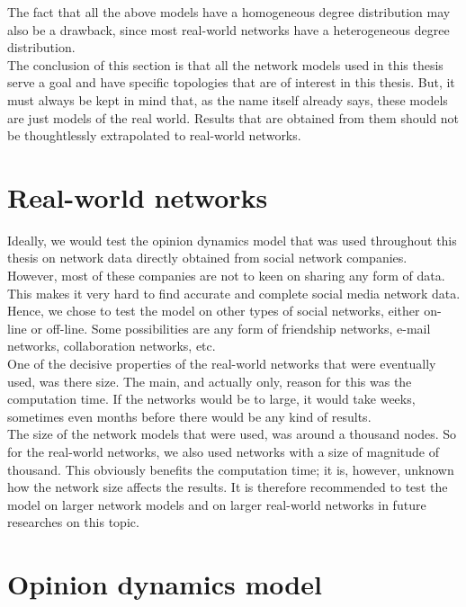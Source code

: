 \documentclass[11 pt , letterpaper , twoside , openright]{book}
\begin{document}
The fact that all the above models have a homogeneous degree distribution may also be a drawback, since most real-world networks have a heterogeneous degree distribution.\\
\newline
The conclusion of this section is that all the network models used in this thesis serve a goal and have specific topologies that are of interest in this thesis. But, it must always be kept in mind that, as the name itself already says, these models are just models of the real world. Results that are obtained from them should not be thoughtlessly extrapolated to real-world networks.


\section{Real-world networks}\label{realnetwork}

Ideally, we would test the opinion dynamics model that was used throughout this thesis on network data directly obtained from social network companies. However, most of these companies are not to keen on sharing any form of data. This makes it very hard to find accurate and complete social media network data. Hence, we chose to test the model on other types of social networks, either on-line or off-line. Some possibilities are any form of friendship networks, e-mail networks, collaboration networks, etc. \\
\newline
One of the decisive properties of the real-world networks that were eventually used, was there size. The main, and actually only, reason for this was the computation time. If the networks would be to large, it would take weeks, sometimes even months before there would be any kind of results.\\
The size of the network models that were used, was around a thousand nodes. So for the real-world networks, we also used networks with a size of magnitude of thousand. This obviously benefits the computation time; it is, however, unknown how the network size affects the results. It is therefore recommended to test the model on larger network models and on larger real-world networks in future researches on this topic. 

 
\section{Opinion dynamics model}\label{opinionmodel}
\end{document}
